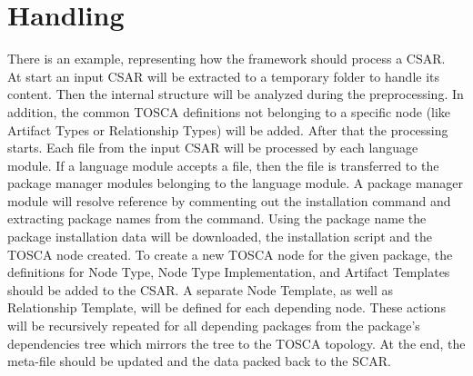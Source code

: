 \section*{Handling}
There is an example, representing how the framework should process a CSAR.\\
At start an input CSAR will be extracted to a temporary folder to handle its content.
Then the internal structure will be analyzed during the preprocessing. 
In addition, the common TOSCA definitions not belonging to a specific node (like Artifact Types or Relationship Types) will be added. 
After that the processing starts. 
Each file from the input CSAR will be processed by each language module.
If a language module accepts a file, then the file is transferred to the package manager modules belonging to the language module.
A package manager module will resolve reference by commenting out the installation command and extracting package names from the command.
Using the package name the package installation data will be downloaded, the installation script and the TOSCA node created. 
To create a new TOSCA node for the given package, the definitions for Node Type, Node Type Implementation, and Artifact Templates should be added to the CSAR. 
A separate Node Template, as well as Relationship Template, will be defined for each depending node.
These actions will be recursively repeated for all depending packages from the package's dependencies tree which mirrors the tree to the TOSCA topology.
At the end, the meta-file should be updated and the data packed back to the SCAR.\\
